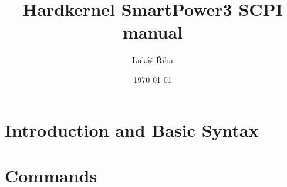 \documentclass[a4paper,10pt]{article}
\title{Hardkernel SmartPower3 SCPI manual}
\author{Lukáš Říha}
\date{\today}
\begin{document}
\renewcommand{\labelenumii}{\arabic{enumi}.\arabic{enumii}}
\renewcommand{\labelenumiii}{\arabic{enumi}.\arabic{enumii}.\arabic{enumiii}}
\renewcommand{\labelenumiv}{\arabic{enumi}.\arabic{enumii}.\arabic{enumiii}.\arabic{enumiv}}

\maketitle
\tableofcontents

\begin{abstract}
\end{abstract}

\section{Introduction and Basic Syntax}

\section{Commands}
\end{document}
